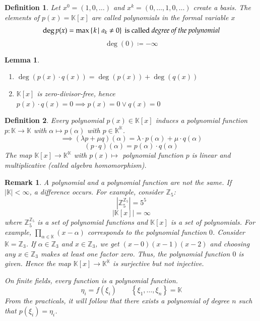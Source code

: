 \documentclass{article}
\newtheorem{definition}{Definition}  \numberwithin{definition}{section}
\newtheorem{lemma}{Lemma}  \numberwithin{lemma}{section}
\newtheorem{remark}{Remark}  \numberwithin{remark}{section}
\newcommand{\set}[1]{\left\{#1\right\}}
\newcommand{\setdef}[2]{\left\{\left.#1\,\right|\,#2\right\}}
\newcommand{\card}[1]{\left|#1\right|}
\begin{document}
\begin{definition} %
  Let $x^0 = (1, 0, \dots)$ and $x^k = (0, \dots, 1, 0, \dots)$ create a basis.
  The elements of $p(x) = \mathbb K[x]$ are called polynomials in the formal variable $x$
  \[ \deg{p(x)} = \max\setdef{k}{a_k \neq 0} \text{ is called \emph{degree of the polynomial}} \]
  \[ \deg(0) \coloneqq -\infty \]
\end{definition}

\begin{lemma}\hfill{} %
  \begin{enumerate}
    \item $\deg(p(x) \cdot q(x)) = \deg(p(x)) + \deg(q(x))$
    \item $\mathbb K[x]$ is zero-divisor-free,
      hence $p(x) \cdot q(x) = 0 \implies p(x) = 0 \lor q(x) = 0$
  \end{enumerate}
\end{lemma}

\begin{definition} %
  Every polynomial $p(x) \in \mathbb K[x]$ induces a polynomial function $p: \mathbb K \to \mathbb K$ with $\alpha \mapsto p(\alpha)$
  with $p \in \mathbb K^{\mathbb K}$.
  \[ \implies (\lambda p + \mu q) (\alpha) = \lambda \cdot p(\alpha) + \mu \cdot q(\alpha) \]
  \[ (p \cdot q)(\alpha) = p(\alpha) \cdot q(\alpha) \]
  The map $\mathbb K[x] \to \mathbb K^{\mathbb K}$ with $p(x) \mapsto$ polynomial function $p$
  is linear and multiplicative (called \emph{algebra homomorphism}).
\end{definition}

\begin{remark} %
  A polynomial and a polynomial function are not the same.
  If $\card{\mathbb K} < \infty$, a difference occurs.
  For example, consider $\mathbb Z_5$:
  \[ \card{\mathbb Z_5^{\mathbb Z_5}} = 5^5 \]
  \[ \card{\mathbb K[x]} = \infty \]
  where $\mathbb Z_5^{\mathbb Z_5}$ is a set of polynomial functions and $\mathbb K[x]$ is a set of polynomials.
  For example, $\prod_{\alpha \in \mathbb K}(x - \alpha)$ corresponds to the polynomial function $0$.
  Consider $\mathbb K = \mathbb Z_3$. If $\alpha \in \mathbb Z_3$ and $x \in \mathbb Z_3$, we get $(x - 0)(x - 1)(x - 2)$
  and choosing any $x \in \mathbb Z_3$ makes at least one factor zero. Thus, the polynomial function $0$ is given.
  Hence the map $\mathbb K[x] \to \mathbb K^{\mathbb K}$ is surjective but not injective.

  On finite fields, every function is a polynomial function.
  \[ \eta_i = f(\xi_i) \qquad \set{\xi_1, \dots, \xi_n} = \mathbb K \]
  From the practicals, it will follow that there exists a polynomial of degree $n$ such that $p(\xi_i) = \eta_i$.
\end{remark}
\end{document}
